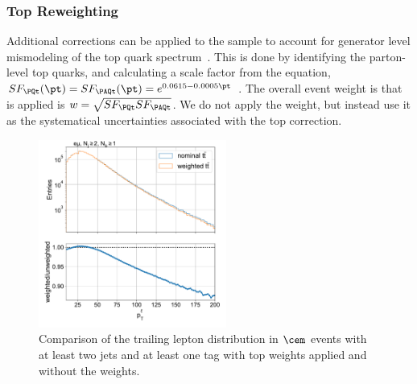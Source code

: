 \subsubsection{Top \pt Reweighting}
Additional corrections can be applied to the \ttbar sample to account for generator level mismodeling of the top quark \pt spectrum~\cite{CMS-PAS-TOP-16-011, CMS-PAS-TOP-16-008}.  This is done by identifying the parton-level top quarks, and calculating a scale factor from the equation, $SF_{\PQt}(\pt) = SF_{\PAQt}(\pt) = e^{0.0615-0.0005 \pt}$ \cite{toppt}. The overall event weight is that is applied is $w = \sqrt{SF_{\PQt}SF_{\PAQt}}$.  We do not apply the weight, but instead use it as the systematical uncertainties associated with the top \pt correction.
\begin{figure}[ht]
    \centering
    \includegraphics[width=0.55\textwidth]{chapters/Analysis/sectionCalibration/figures/generator/top_pt_weight}
    \caption{Comparison of the trailing lepton \pt distribution in $\cem$ events with at least two jets and at least one \PQb tag with top \pt weights applied and without the weights.}
    \label{fig:analysis:calibration:top_pt_weight}
\end{figure}


